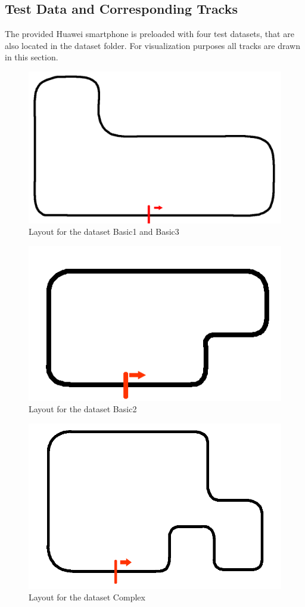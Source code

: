 \subsection{Test Data and Corresponding Tracks}
The provided Huawei smartphone is preloaded with four test datasets, that are also located in the dataset folder. For visualization purposes all tracks are drawn in this section.
\begin{figure}[H]
	\centering
	\includegraphics[scale= 0.5]{Pictures/Basic1.png}
	\caption{Layout for the dataset Basic1 and Basic3}
	\label{Basic1}
\end{figure}
\begin{figure}[H]
	\centering
	\includegraphics[scale= 1]{Pictures/Basic2.png}
	\caption{Layout for the dataset Basic2}
	\label{Basic2}
\end{figure}
\begin{figure}[H]
	\centering
	\includegraphics[scale= 0.5]{Pictures/Complex.png}
	\caption{Layout for the dataset Complex}
	\label{Complex}
\end{figure}


